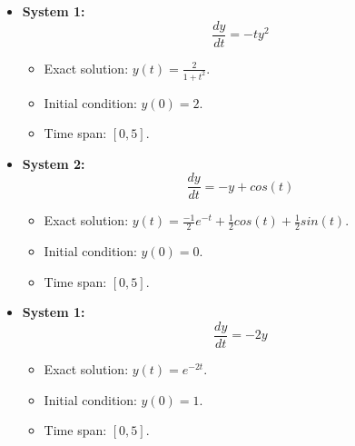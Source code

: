 \documentclass[a4paper,12pt,french]{article}
\begin{document}
\begin{itemize}
    \item \textbf{System 1:} \newline \begin{equation}
            \frac{dy}{dt} = -ty^2
            \end{equation}
            \begin{itemize}
                \item Exact solution: $y(t)=\frac{2}{1+t^2}$.
                \item Initial condition: $y(0)=2$.
                \item Time span: $[0,5]$.
            \end{itemize}
    \item \textbf{System 2:} \newline \begin{equation}
            \frac{dy}{dt} = -y+ cos(t)
            \end{equation}
            \begin{itemize}
                \item Exact solution: $y(t)=\frac{-1}{2}e^{-t}+\frac{1}{2}cos(t)+\frac{1}{2}sin(t)$.
                \item Initial condition: $y(0)=0$.
                \item Time span: $[0,5]$.
            \end{itemize}
    \item \textbf{System 1:} \newline \begin{equation}
            \frac{dy}{dt} = -2y
            \end{equation}
            \begin{itemize}
                \item Exact solution: $y(t)=e^{-2t}$.
                \item Initial condition: $y(0)=1$.
                \item Time span: $[0,5]$.
            \end{itemize}
\end{itemize}

\end{document}
